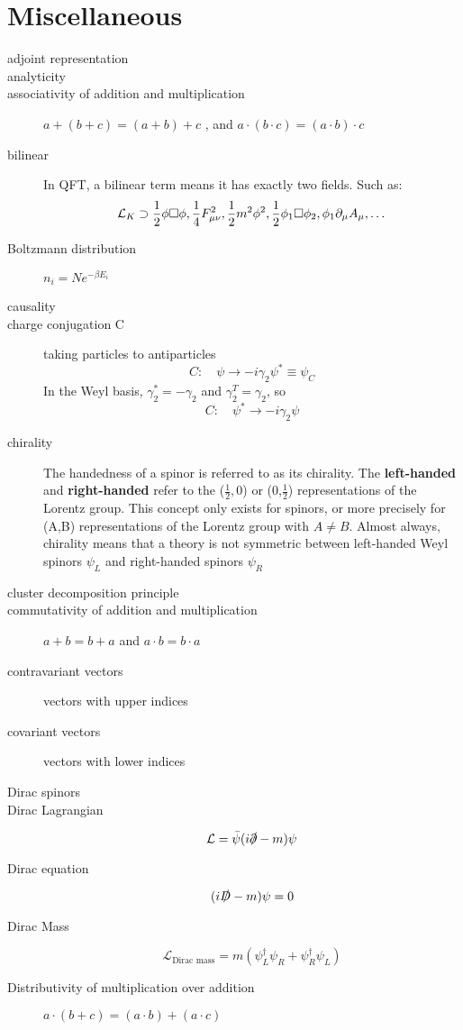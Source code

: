 \section{Miscellaneous}
\begin{description}
    \item [adjoint representation]
    \item [analyticity]
    \item [associativity of addition and multiplication]    
	$a+(b+c) = (a+b)+c$   , and $a\cdot(b\cdot c)=(a\cdot b)\cdot c$
    \item [bilinear]	In QFT, a bilinear term means it has exactly two
	fields. Such as:
	\[ \mathcal{L}_K \supset \frac{1}{2}\phi\Box\phi,
	\frac{1}{4}F^2_{\mu\nu}, \frac{1}{2}m^2\phi^2,
	\frac{1}{2}\phi_1\Box\phi_2, \phi_1\partial_\mu A_\mu, \dots \]

    \item [Boltzmann distribution]  $n_{i} = Ne^{-\beta E_{i}}$

    \item [causality]
    \item [charge conjugation C] taking particles to antiparticles
	\[  C:\quad\psi\rightarrow-i\gamma_2\psi^*\equiv\psi_C	\]
	In the Weyl basis, $\gamma_2^*=-\gamma_2$ and $\gamma_2^T=\gamma_2$, so
	\[  C:\quad\psi^*\rightarrow-i\gamma_2\psi  \]
    \item [chirality] The handedness of a spinor is referred to as its
	chirality. The \textbf{left-handed} and \textbf{right-handed} 
	refer to the ($\frac{1}{2},0$) or (0,$\frac{1}{2}$) representations
	of the Lorentz group. This concept only exists for spinors, or more
	precisely for (A,B) representations of the Lorentz group with
	$A\neq B$. Almost always, chirality means that a theory is not
	symmetric between left-handed Weyl spinors $\psi_L$ and right-handed
	spinors $\psi_R$
    \item [cluster decomposition principle]
    \item [commutativity of addition and multiplication] 
	$a+b=b+a$ and $a\cdot b = b\cdot a$
    \item [contravariant vectors]   vectors with upper indices
    \item [covariant vectors]	vectors with lower indices

    \item [Dirac spinors]
    \item [Dirac Lagrangian] 
	\[
	    \mathcal{L}=\bar{\psi}(i\slashed{\partial}-m)\psi
	\]
    \item [Dirac equation]
	\[  
	    (i\slashed{D} -m)\psi =0	
	\]
    \item [Dirac Mass]
	\[  
	    \mathcal{L}_{\text{Dirac mass}} = m(\psi_L^\dag\psi_R + \psi^\dag_R\psi_L) 
	\]
    \item [Distributivity of multiplication over addition]
	$a\cdot(b+c)=(a\cdot b) + (a\cdot c)$


\end{description}
